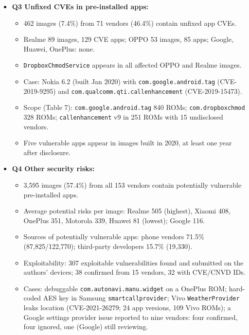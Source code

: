 \documentclass[11pt,a4paper]{article}
\begin{document}
\begin{enumerate}
\begin{itemize}[leftmargin=*,itemsep=1pt,topsep=2pt]
\begin{itemize}[itemsep=0pt]
        \end{itemize}
        \item \textbf{Q3 Unfixed CVEs in pre-installed apps:}
        \begin{itemize}[itemsep=0pt]
            \item 462 images (7.4\%) from 71 vendors (46.4\%) contain unfixed app CVEs.
            \item Realme 89 images, 129 CVE apps; OPPO 53 images, 85 apps; Google, Huawei, OnePlus: none.
            \item \texttt{DropboxChmodService} appears in all affected OPPO and Realme images.
            \item Case: Nokia 6.2 (built Jan 2020) with \texttt{com.google.android.tag} (CVE-2019-9295) and \texttt{com.qualcomm.qti.callenhancement} (CVE-2019-15473).
            \item Scope (Table 7): \texttt{com.google.android.tag} 840 ROMs; \texttt{com.dropboxchmod} 328 ROMs; \texttt{callenhancement} v9 in 251 ROMs with 15 undisclosed vendors.
            \item Five vulnerable apps appear in images built in 2020, at least one year after disclosure.
        \end{itemize}
        \item \textbf{Q4 Other security risks:}
        \begin{itemize}[itemsep=0pt]
            \item 3,595 images (57.4\%) from all 153 vendors contain potentially vulnerable pre-installed apps.
            \item Average potential risks per image: Realme 505 (highest), Xiaomi 408, OnePlus 351, Motorola 339, Huawei 81 (lowest); Google 116.
            \item Sources of potentially vulnerable apps: phone vendors 71.5\% (87,825/122,770); third-party developers 15.7\% (19,330).
            \item Exploitability: 307 exploitable vulnerabilities found and submitted on the authors' devices; 38 confirmed from 15 vendors, 32 with CVE/CNVD IDs.
            \item Cases: debuggable \texttt{com.autonavi.manu.widget} on a OnePlus ROM; hard-coded AES key in Samsung \texttt{smartcallprovider}; Vivo \texttt{WeatherProvider} leaks location (CVE-2021-26279; 24 app versions, 109 Vivo ROMs); a Google settings provider issue reported to nine vendors: four confirmed, four ignored, one (Google) still reviewing.
        \end{itemize}
    \end{itemize}


\end{enumerate}
\end{document}

